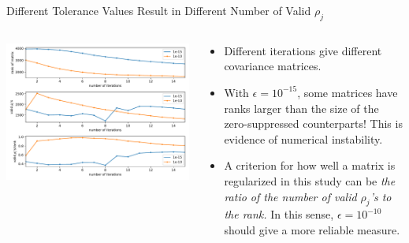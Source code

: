 \documentclass[aspectratio=169]{beamer}
\begin{document}
\begin{frame}{Different Tolerance Values Result in Different Number of Valid $\rho_j$}
  \begin{columns}
    \begin{column}{.6\textwidth}
      \includegraphics[width=\textwidth]{figures/valid_rank_ratio.pdf}
    \end{column}
    \begin{column}{.4\textwidth}
      \begin{itemize}
        \footnotesize
        \item Different iterations give different covariance matrices.
        \item With $\epsilon=10^{-15}$, some matrices have ranks larger than the size of the zero-suppressed counterparts! This is evidence of numerical instability.
        \item A criterion for how well a matrix is regularized in this study can be \emph{the ratio of the number of valid $\rho_j$'s to the rank.} In this sense, $\epsilon=10^{-10}$ should give a more reliable measure.
      \end{itemize}
    \end{column}
  \end{columns}
\end{frame}
\end{document}
